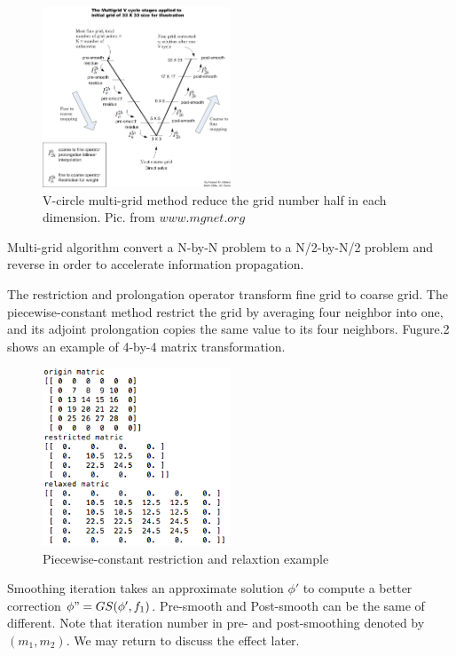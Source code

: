 \documentclass[12pt]{article}
\begin{document}
\begin{figure}[h!]
	\begin{center}
		\includegraphics[width=0.5\textwidth]{multigrid_V.png}
		\caption{V-circle multi-grid method reduce the grid number half in each dimension. Pic. from $www.mgnet.org$}
		\label{fig1}
	\end{center}
\end{figure}

Multi-grid algorithm convert a N-by-N problem to a N/2-by-N/2 problem and reverse in order to accelerate information propagation. 

The restriction and prolongation operator transform fine grid to coarse grid. The piecewise-constant method restrict the grid by averaging four neighbor into one, and its adjoint prolongation copies the same value to its four neighbors. Fugure.2 shows an example of 4-by-4 matrix transformation.
\begin{figure}[h!]
	\begin{center}
		\includegraphics[width=0.5\textwidth]{restrict.png}
		\caption{Piecewise-constant restriction and relaxtion example}
		\label{fig2}
	\end{center}
\end{figure}
Smoothing iteration takes an approximate solution $\phi'$ to compute a better correction $\phi"=GS(\phi',f_1)$. Pre-smooth and Post-smooth can be the same of different. Note that iteration number in pre- and post-smoothing denoted by $(m_1,m_2)$. We may return to discuss the effect later.
\end{document}
